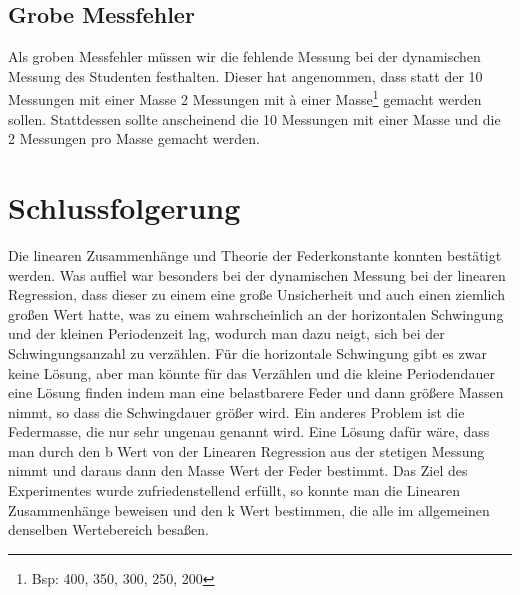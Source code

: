 \documentclass[bibliography=totocnumbered]{scrartcl}
\begin{document}
	\subsection{Grobe Messfehler}
	Als groben Messfehler müssen wir die fehlende Messung bei der dynamischen Messung des Studenten festhalten. Dieser hat angenommen, dass statt der 10 Messungen mit einer Masse 2 Messungen mit à einer Masse\footnote{Bsp: 400, 350, 300, 250, 200} gemacht werden sollen. Stattdessen sollte anscheinend die 10 Messungen mit einer Masse und die 2 Messungen pro Masse gemacht werden. 
	
	\newpage
	\section{Schlussfolgerung}
	Die linearen Zusammenhänge und Theorie der Federkonstante konnten bestätigt werden.
	Was auffiel war besonders bei der dynamischen Messung bei der linearen Regression, dass dieser zu
	einem eine große Unsicherheit und auch einen ziemlich großen Wert hatte, was zu einem
	wahrscheinlich an der horizontalen Schwingung und der kleinen Periodenzeit lag, wodurch man dazu
	neigt, sich bei der Schwingungsanzahl zu verzählen.
	Für die horizontale Schwingung gibt es zwar keine Lösung, aber man könnte für das Verzählen und
	die kleine Periodendauer eine Lösung finden indem man eine belastbarere Feder und dann größere
	Massen nimmt, so dass die Schwingdauer größer wird.
	Ein anderes Problem ist die Federmasse, die nur sehr ungenau genannt wird. Eine Lösung dafür
	wäre, dass man durch den b Wert von der Linearen Regression aus der stetigen Messung nimmt und
	daraus dann den Masse Wert der Feder bestimmt.
	Das Ziel des Experimentes wurde zufriedenstellend erfüllt, so konnte man die Linearen
	Zusammenhänge beweisen und den k Wert bestimmen, die alle im allgemeinen
	denselben Wertebereich besaßen. 
	\newpage
    \appendix
	
	\newpage
	\printbibliography[title={Quellenverzeichnis}]
	
	
\end{document}
